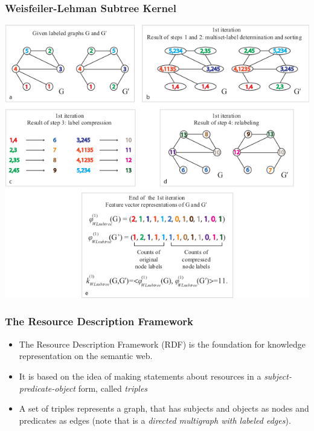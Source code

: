 \documentclass{beamer}
\begin{document}

\begin{frame}
\frametitle{Weisfeiler-Lehman Subtree Kernel}

\begin{center}
\begin{figure}
\end{figure}
\includegraphics[width=\textwidth,height=0.8\textheight,keepaspectratio]{img/wl_iteration_total.png}
\end{center}

\end{frame}


\begin{frame}
\frametitle{The Resource Description Framework}

\begin{itemize}
\item
The Resource Description Framework (RDF) is the foundation for knowledge representation on the semantic web.

\item
It is based on the  idea of making statements about resources in a \textit{subject-predicate-object} form, called \textit{triples}

\item
A set of triples represents a graph, that has subjects and objects as nodes and predicates as edges (note that is a \textit{directed multigraph with labeled edges}).
\end{itemize}

\end{frame}
\end{document}
